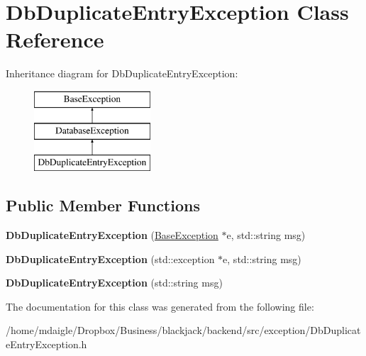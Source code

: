 \hypertarget{classDbDuplicateEntryException}{
\section{\-Db\-Duplicate\-Entry\-Exception \-Class \-Reference}
\label{classDbDuplicateEntryException}
}
\-Inheritance diagram for \-Db\-Duplicate\-Entry\-Exception\-:\begin{figure}[H]
\begin{center}
\leavevmode
\includegraphics[height=3.000000cm]{classDbDuplicateEntryException}
\end{center}
\end{figure}
\subsection*{\-Public \-Member \-Functions}
\begin{DoxyCompactItemize}
\item 
\hypertarget{classDbDuplicateEntryException_a3917e761c61143101291f0d97bf83d47}{
{\bfseries \-Db\-Duplicate\-Entry\-Exception} (\hyperlink{classBaseException}{\-Base\-Exception} $\ast$e, std\-::string msg)}
\label{classDbDuplicateEntryException_a3917e761c61143101291f0d97bf83d47}

\item 
\hypertarget{classDbDuplicateEntryException_afbd52a2b5af4fb9042f992c38cfbe0bd}{
{\bfseries \-Db\-Duplicate\-Entry\-Exception} (std\-::exception $\ast$e, std\-::string msg)}
\label{classDbDuplicateEntryException_afbd52a2b5af4fb9042f992c38cfbe0bd}

\item 
\hypertarget{classDbDuplicateEntryException_a2b468a896e3192f01dc853ac0c4b3a98}{
{\bfseries \-Db\-Duplicate\-Entry\-Exception} (std\-::string msg)}
\label{classDbDuplicateEntryException_a2b468a896e3192f01dc853ac0c4b3a98}

\end{DoxyCompactItemize}


\-The documentation for this class was generated from the following file\-:\begin{DoxyCompactItemize}
\item 
/home/mdaigle/\-Dropbox/\-Business/blackjack/backend/src/exception/\-Db\-Duplicate\-Entry\-Exception.\-h\end{DoxyCompactItemize}
